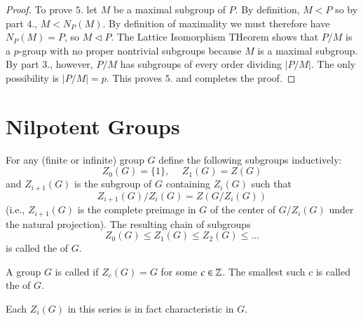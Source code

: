 \begin{proof}
    To prove $5.$ let $M$ be a maximal subgroup of $P$. By definition, $M < P$ so by part $4.$, $M < N_P(M)$. By definition of maximality we must therefore have $N_P(M) = P$, so $M \triangleleft P$. The Lattice Isomorphism THeorem shows that $P/M$ is a $p$-group with no proper nontrivial subgroups because $M$ is a maximal subgroup. By part $3.$, however, $P/M$ has subgroups of every order dividing $|P/M|$. The only possibility is $|P/M| = p$. This proves $5.$ and completes the proof.
\end{proof}


\section{\textsection Nilpotent Groups}

\begin{defn}
    For any (finite or infinite) group $G$ define the following subgroups inductively: \begin{equation*}
        Z_0(G) = \{1\}, \hspace{15pt} Z_1(G) = Z(G)
    \end{equation*}
    and $Z_{i+1}(G)$ is the subgroup of $G$ containing $Z_i(G)$ such that \begin{equation*}
        Z_{i+1}(G)/Z_i(G) = Z(G/Z_i(G))
    \end{equation*}
    (i.e., $Z_{i+1}(G)$ is the complete preimage in $G$ of the center of $G/Z_i(G)$ under the natural projection). The resulting chain of subgroups \begin{equation*}
        Z_0(G) \leq Z_1(G) \leq Z_2(G) \leq ...
    \end{equation*}
    is called the  of $G$.
\end{defn}


\begin{defn}
    A group $G$ is called  if $Z_c(G) = G$ for some $c \in \mathbb Z$. The smallest such $c$ is called the  of $G$.
\end{defn}


Each $Z_i(G)$ in this series is in fact characteristic in $G$.


